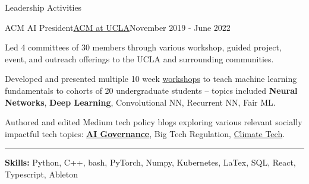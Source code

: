 \documentclass{resume}
\begin{document}
\begin{rSection}{Leadership Activities}
    \begin{rSubsection}{ACM AI President}{\href{https://www.uclaacm.com/}{ACM at UCLA}}{November 2019 - June 2022}
        \item Led 4 committees of 30 members through various workshop, guided project, event, and outreach offerings to the UCLA and surrounding communities.
        \item Developed and presented multiple 10 week \href{https://www.youtube.com/playlist?list=PLPO7_kXilXFYGa-3ZpOXa7Z01ZYAtUh1U}{workshops}
        to teach machine learning fundamentals to cohorts of 20 undergraduate students – topics included \textbf{Neural Networks}, \textbf{Deep Learning}, Convolutional NN, Recurrent NN, Fair ML.
        \item Authored and edited Medium tech policy blogs exploring various relevant socially impactful tech topics: \href{https://medium.com/impact-labs/considerations-for-the-future-of-ai-governance-46d727012c5b}{\bf AI Governance}, Big Tech Regulation, \href{https://medium.com/acm-at-ucla/digital-tech-for-a-greener-future-7bc7f2e00bda}{Climate Tech}.
    \end{rSubsection}
\end{rSection}
\hrule
{\bf Skills:} Python, C++, bash, PyTorch, Numpy, Kubernetes, LaTex, SQL, React, Typescript, Ableton
\end{document}
